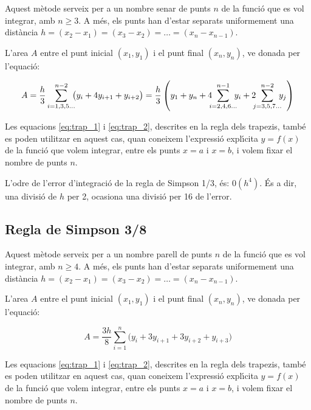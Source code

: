 Aquest m\`{e}tode serveix per a un nombre senar de punts $n$ de la funci\'{o} que es vol integrar, amb $n \geq 3$. A m\'{e}s, els punts han d'estar separats uniformement una dist\`{a}ncia $h = (x_2-x_1) = (x_3-x_2) = \dots = (x_n-x_{n-1})$.

L'area $A$ entre el punt inicial $(x_1, y_1)$ i el punt final $(x_n, y_n)$, ve donada per l'equaci\'{o}:

 \begin{equation}\label{eq:simp_1_3}
   A =  \frac{h}{3} \sum_{i=1,3,5\dots}^{n-2} \hspace{-0.5em} \big( y_i + 4 y_{i+1} + y_{i+2} \big) =
   \frac{h}{3} \left( y_1 + y_n + 4 \hspace{-0.5em} \sum_{i=2,4,6\dots}^{n-1} \hspace{-0.5em} y_i +
   2 \hspace{-0.5em} \sum_{j=3,5,7\dots}^{n-2} \hspace{-0.5em} y_j \right)
 \end{equation}

Les equacions \eqref{eq:trap_1} i \eqref{eq:trap_2}, descrites en la regla dels trapezis, tamb\'{e} es poden utilitzar en aquest cas, quan  coneixem l'expressi\'{o} expl\'{\i}cita $y=f(x)$ de la funci\'{o} que volem integrar, entre els punts $x=a$ i $x=b$, i volem fixar el nombre de punts $n$.

L'odre de l'error d'integraci\'{o} de la regla de Simpson 1/3, \'{e}s: $0(h^4)$. \'{E}s a dir, una divisi\'{o} de $h$ per 2, ocasiona una divisi\'{o} per 16 de l'error.

 \subsection{Regla de Simpson 3/8}

Aquest m\`{e}tode serveix per a un nombre parell de punts $n$ de la funci\'{o} que es vol integrar, amb $n \geq 4$. A m\'{e}s, els punts han d'estar separats uniformement una dist\`{a}ncia $h = (x_2-x_1) = (x_3-x_2) = \dots = (x_n-x_{n-1})$.

L'area $A$ entre el punt inicial $(x_1, y_1)$ i el punt final $(x_n, y_n)$, ve donada per l'equaci\'{o}:

 \begin{equation}\label{eq:simp_3_8}
   A =  \frac{3h}{8} \sum_{i=1}^{n} \big( y_i + 3 y_{i+1} + 3 y_{i+2} + y_{i+3}\big)
 \end{equation}

 Les equacions \eqref{eq:trap_1} i \eqref{eq:trap_2}, descrites en la regla dels trapezis, tamb\'{e} es poden utilitzar en aquest cas, quan  coneixem l'expressi\'{o} expl\'{\i}cita $y=f(x)$ de la funci\'{o} que volem integrar, entre els punts $x=a$ i $x=b$, i volem fixar el nombre de punts $n$.

